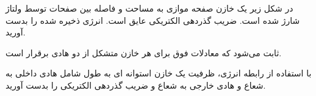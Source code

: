 \begin{ELexample}{}

در شکل زیر یک خازن صفحه موازی به مساحت  و فاصله بین صفحات  توسط ولتاژ  شارژ شده است. ضریب گذردهی الکتریکی عایق \ELim{\epsilon} است. انرژی ذخیره شده را بدست آورید.


\begin{ELsolution}


\begin{ELimportant}{}


\end{ELimportant}

\begin{ELremark}{}

ثابت می‌شود که معادلات فوق برای هر خازن متشکل از دو هادی برقرار است.

\end{ELremark}

\end{ELsolution}

\end{ELexample}


\begin{ELexample}{}

با استفاده از رابطه انرژی، ظرفیت یک خازن استوانه ای به طول  شامل هادی داخلی به شعاع  و هادی خارجی به شعاع  و ضریب گذردهی الکتریکی \ELim{\epsilon} را بدست آورید.

\begin{ELsolution}


\end{ELsolution}

\end{ELexample}

\begin{ELunit}


\end{ELunit}
